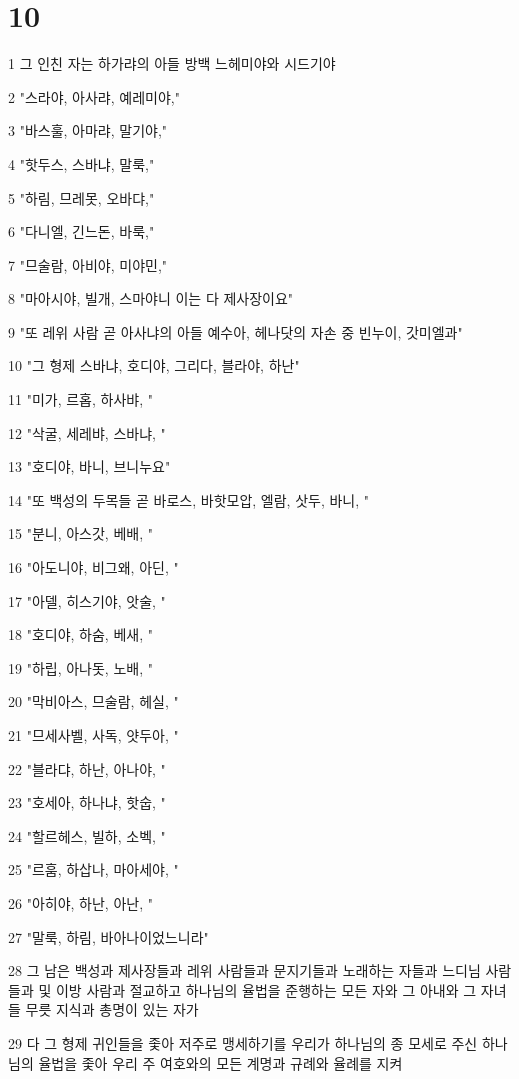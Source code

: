 \chapter{10}

\par 1 그 인친 자는 하가랴의 아들 방백 느헤미야와 시드기야
\par 2 "스라야, 아사랴, 예레미야,"
\par 3 "바스훌, 아마랴, 말기야,"
\par 4 "핫두스, 스바냐, 말룩,"
\par 5 "하림, 므레못, 오바댜,"
\par 6 "다니엘, 긴느돈, 바룩,"
\par 7 "므술람, 아비야, 미야민,"
\par 8 "마아시야, 빌개, 스마야니 이는 다 제사장이요"
\par 9 "또 레위 사람 곧 아사냐의 아들 예수아, 헤나닷의 자손 중 빈누이, 갓미엘과"
\par 10 "그 형제 스바냐, 호디야, 그리다, 블라야, 하난"
\par 11 "미가, 르홉, 하사뱌, "
\par 12 "삭굴, 세레뱌, 스바냐, "
\par 13 "호디야, 바니, 브니누요"
\par 14 "또 백성의 두목들 곧 바로스, 바핫모압, 엘람, 삿두, 바니, "
\par 15 "분니, 아스갓, 베배, "
\par 16 "아도니야, 비그왜, 아딘, "
\par 17 "아델, 히스기야, 앗술, "
\par 18 "호디야, 하숨, 베새, "
\par 19 "하립, 아나돗, 노배, "
\par 20 "막비아스, 므술람, 헤실, "
\par 21 "므세사벨, 사독, 얏두아, "
\par 22 "블라댜, 하난, 아나야, "
\par 23 "호세아, 하나냐, 핫숩, "
\par 24 "할르헤스, 빌하, 소벡, "
\par 25 "르훔, 하삽나, 마아세야, "
\par 26 "아히야, 하난, 아난, "
\par 27 "말룩, 하림, 바아나이었느니라"
\par 28 그 남은 백성과 제사장들과 레위 사람들과 문지기들과 노래하는 자들과 느디님 사람들과 및 이방 사람과 절교하고 하나님의 율법을 준행하는 모든 자와 그 아내와 그 자녀들 무릇 지식과 총명이 있는 자가
\par 29 다 그 형제 귀인들을 좇아 저주로 맹세하기를 우리가 하나님의 종 모세로 주신 하나님의 율법을 좇아 우리 주 여호와의 모든 계명과 규례와 율례를 지켜
